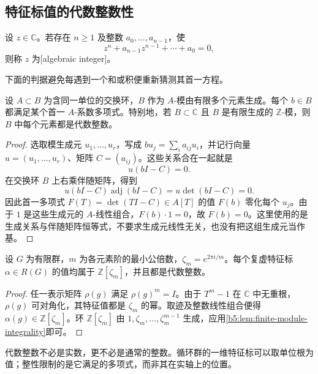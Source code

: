 \subsection{特征标值的代数整数性}
\label{b5:subsec:0501:02}

\begin{definition}\label{b5:def:algebraic-integer}
	设 \(z\in\mathbb C\)。若存在 \(n\ge1\) 及整数 \(a_0,\ldots,a_{n-1}\)，使
	\[
		z^n+a_{n-1}z^{n-1}+\cdots+a_0=0,
	\]
	则称 \(z\) 为[algebraic integer]。
\end{definition}

下面的判据避免每遇到一个和或积便重新猜测其首一方程。
\begin{lemma}[有限生成模的整性判据]\label{b5:lem:finite-module-integrality}
	设 \(A\subset B\) 为含同一单位的交换环，\(B\) 作为 \(A\)-模由有限多个元素生成。每个 \(b\in B\) 都满足某个首一 \(A\)-系数多项式。特别地，若 \(B\subset\mathbb C\) 且 \(B\) 是有限生成的 \(\mathbb Z\)-模，则 \(B\) 中每个元素都是代数整数。
\end{lemma}
\begin{proof}
	选取模生成元 \(u_1,\ldots,u_r\)，写成 \(bu_j=\sum_i a_{ij}u_i\)，并记行向量 \(u=(u_1,\ldots,u_r)\)、矩阵 \(C=(a_{ij})\)。这些关系合在一起就是
	\[
		u(bI-C)=0.
	\]
	在交换环 \(B\) 上右乘伴随矩阵，得到
	\[
		u(bI-C)\operatorname{adj}(bI-C) =u\det(bI-C)=0.
	\]
	因此首一多项式 \(F(T)=\det(TI-C)\in A[T]\) 的值 \(F(b)\) 零化每个 \(u_j\)。由于 \(1\) 是这些生成元的 \(A\)-线性组合，\(F(b)\cdot1=0\)，故 \(F(b)=0\)。这里使用的是生成关系与伴随矩阵恒等式，不要求生成元线性无关，也没有把这组生成元当作基。
\end{proof}

\begin{proposition}\label{b5:prop:character-values-integral}
	设 \(G\) 为有限群，\(m\) 为各元素阶的最小公倍数，\(\zeta_m=e^{2\pi i/m}\)。每个复虚特征标 \(\alpha\in R(G)\) 的值均属于 \(\mathbb Z[\zeta_m]\)，并且都是代数整数。
\end{proposition}
\begin{proof}
	任一表示矩阵 \(\rho(g)\) 满足 \(\rho(g)^m=I\)。由于 \(T^m-1\) 在 \(\mathbb C\) 中无重根，\(\rho(g)\) 可对角化，其特征值都是 \(\zeta_m\) 的幂。取迹及整数线性组合便得 \(\alpha(g)\in\mathbb Z[\zeta_m]\)。环 \(\mathbb Z[\zeta_m]\) 由 \(1,\zeta_m,\ldots,\zeta_m^{m-1}\) 生成，应用\cref{b5:lem:finite-module-integrality}即可。
\end{proof}

代数整数不必是实数，更不必是通常的整数。循环群的一维特征标可以取单位根为值；整性限制的是它满足的多项式，而非其在实轴上的位置。

